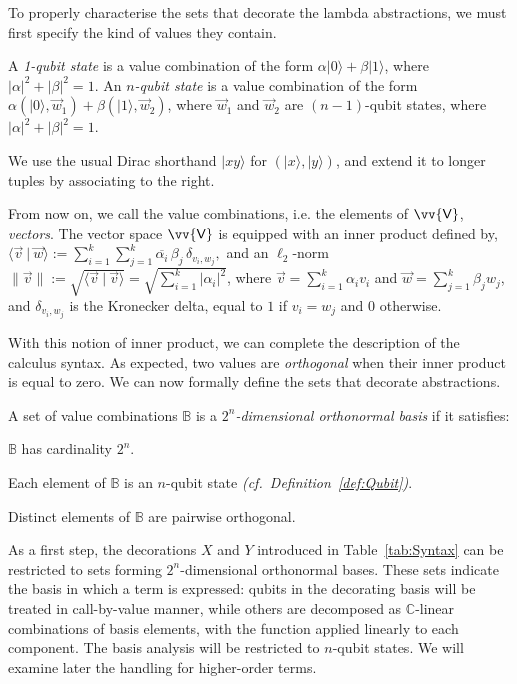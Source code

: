 \documentclass[a4paper,UKenglish,numberwithinsect,pdfa,anonymous]{lipics-v2021}
\theoremstyle{restatestyle}
\newcommand\ket[1]{\ensuremath{|#1\rangle}}
\DeclareRobustCommand{\ValD}{\ensuremath{\vv{\mathsf{V}}}}
\def\C{\mathbb{C}}            %
\def\scal#1#2{\langle{#1}~|~{#2}\rangle}
\def\Pair#1#2{(#1,#2)} %
\begin{document}
To properly characterise the sets that decorate the lambda abstractions, we
must first specify the kind of values they contain.
\begin{definition}[Qubits]\label{def:Qubit}
  A \emph{1-qubit state} is a value combination of the form
  $\alpha\ket{0} + \beta\ket{1}$, where $|\alpha|^2 + |\beta|^2 = 1$. An
  \emph{$n$-qubit state} is a value combination of the form
  $\alpha\Pair{\ket{0}}{\vec{w}_{1}} + \beta\Pair{\ket{1}}{\vec{w}_{2}}$, where
  $\vec{w}_{1}$ and $\vec{w}_{2}$ are $(n-1)$-qubit states,
  where $|\alpha|^2 + |\beta|^2 = 1$.
\end{definition}
We use the usual Dirac shorthand $\ket{xy}$ for $(\ket{x},\ket{y})$, and
extend it to longer tuples by associating to the right.

From now on, we call the value combinations, i.e. the elements of $\ValD$,
\emph{vectors}. The vector space $\ValD$ is equipped with an inner
product defined by,  
\(
  \scal{\vec{v}}{\vec{w}} := \sum_{i=1}^k\sum_{j=1}^k
  \overline{\alpha_i}\,\beta_j\,\delta_{v_i,w_j},
\)
and an $\ell_2$-norm 
\(
  \|\vec{v}\| := \sqrt{\scal{\vec{v}}{\vec{v}}}
  = \sqrt{\sum_{i=1}^k|\alpha_i|^2}
\),
where $\vec{v}=\sum_{i=1}^k\alpha_i v_i$ and
$\vec{w}=\sum_{j=1}^k\beta_j w_j$, and $\delta_{v_i,w_j}$ is the Kronecker
delta, equal to $1$ if $v_i=w_j$ and $0$ otherwise.

With this notion of inner product, we can complete the description of the
calculus syntax. As expected, two values are \emph{orthogonal} when their inner
product is equal to zero. We can now formally define the sets that
decorate abstractions.
\begin{definition}[Basis]\label{def:NthDimensionalBasis}
  A set of value combinations $\mathbb{B}$ is a \emph{$2^n$-dimensional orthonormal
  basis} if it satisfies:
  \begin{enumerate*}
    \item $\mathbb{B}$ has cardinality $2^n$.
    \item Each element of $\mathbb{B}$ is an $n$-qubit state \emph{(cf.~Definition~\ref{def:Qubit})}.
    \item Distinct elements of $\mathbb{B}$ are pairwise orthogonal.
  \end{enumerate*}
\end{definition}

As a first step, the decorations $X$ and $Y$ introduced in Table~\ref{tab:Syntax}
can be restricted to sets forming $2^n$-dimensional
orthonormal bases. These sets indicate the basis in which a term is expressed:
qubits in the decorating basis will be treated in call-by-value manner, while
others are decomposed as $\C$-linear combinations of basis elements, with the
function applied linearly to each component. The basis analysis will be
restricted to $n$-qubit states. We will examine later the handling for
higher-order terms.
\end{document}

